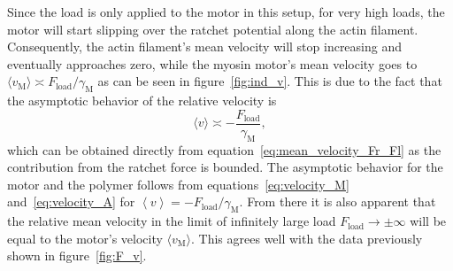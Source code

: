 \documentclass[aps,pre,twocolumn,showpacs,showkeys,superscriptaddress,floatfix]{revtex4-1}
\begin{document}
Since the load is only applied to the motor in this setup, for very high loads, the motor will start slipping over the ratchet potential along the actin filament. 
Consequently, the actin filament's mean velocity will stop increasing and eventually approaches zero, 
while the myosin motor's mean velocity goes to $\langle v_\text{M} \rangle \asymp F_\text{load}/\gamma_\text{M} $
as can be seen in figure~\ref{fig:ind_v}. 
This is due to the fact that the asymptotic behavior of the relative velocity  is
\[
\langle v \rangle \asymp - \frac{ F_\text{load} }{\gamma_\text{M} },
\]
which can be obtained directly from equation~\eqref{eq:mean_velocity_Fr_Fl} as the contribution from the ratchet force is bounded.
The asymptotic behavior for the motor and the polymer follows from equations~\eqref{eq:velocity_M} and~\eqref{eq:velocity_A} for $ \left\langle v \right\rangle = - F_\text{load} / \gamma_\text{M} $. 
From there it is also apparent that the relative mean velocity in the limit of infinitely large load $F_\text{load} \to \pm \infty$ will be equal to the motor's velocity $\langle v_\text{M} \rangle$.
This agrees well with the data previously shown in figure~\ref{fig:F_v}.
\end{document}

